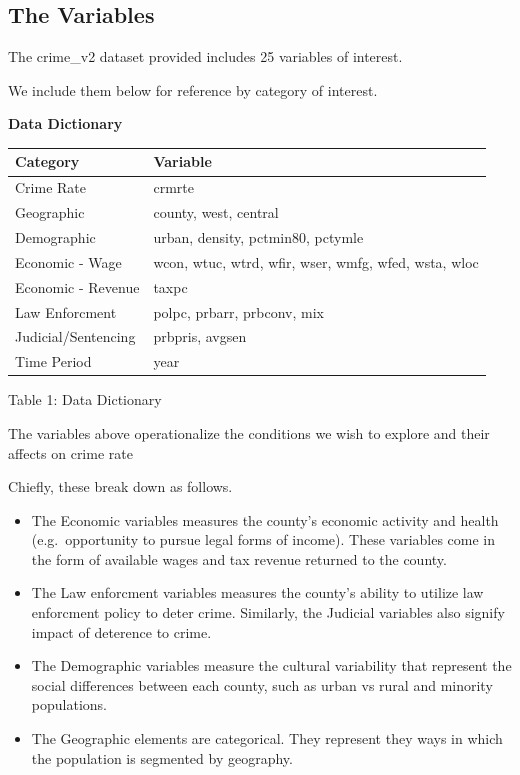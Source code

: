 \documentclass[]{article}
\begin{document}
\hypertarget{the-variables}{%
\subsection{The Variables}\label{the-variables}}

The crime\_v2 dataset provided includes 25 variables of interest.

We include them below for reference by category of interest.

\begin{center}
\textbf{Data Dictionary}
\end{center}

\begin{longtable}[]{@{}ll@{}}
\toprule
Category & Variable\tabularnewline
\midrule
\endhead
Crime Rate & crmrte\tabularnewline
Geographic & county, west, central\tabularnewline
Demographic & urban, density, pctmin80, pctymle\tabularnewline
Economic - Wage & wcon, wtuc, wtrd, wfir, wser, wmfg, wfed, wsta,
wloc\tabularnewline
Economic - Revenue & taxpc\tabularnewline
Law Enforcment & polpc, prbarr, prbconv, mix\tabularnewline
Judicial/Sentencing & prbpris, avgsen\tabularnewline
Time Period & year\tabularnewline
\bottomrule
\end{longtable}

\begin{center}
Table 1: Data Dictionary
\end{center}

The variables above operationalize the conditions we wish to explore and
their affects on crime rate

Chiefly, these break down as follows.

\begin{itemize}
\item
  The Economic variables measures the county's economic activity and
  health (e.g.~opportunity to pursue legal forms of income). These
  variables come in the form of available wages and tax revenue returned
  to the county.
\item
  The Law enforcment variables measures the county's ability to utilize
  law enforcment policy to deter crime. Similarly, the Judicial
  variables also signify impact of deterence to crime.
\item
  The Demographic variables measure the cultural variability that
  represent the social differences between each county, such as urban vs
  rural and minority populations.
\item
  The Geographic elements are categorical. They represent they ways in
  which the population is segmented by geography.
\end{itemize}
\end{document}
